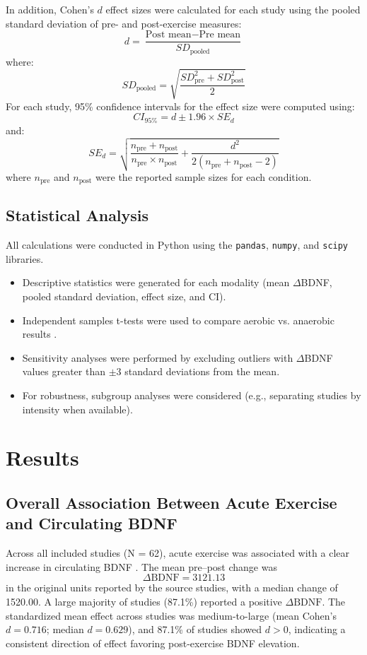 \documentclass[runningheads]{llncs}
\begin{document}
In addition, Cohen's $d$ effect sizes were calculated for each study using the pooled standard deviation of pre- and post-exercise measures:
\[
d = \frac{\text{Post mean} - \text{Pre mean}}{SD_{\text{pooled}}}
\]
where:
\[
SD_{\text{pooled}} = \sqrt{\frac{SD_{\text{pre}}^2 + SD_{\text{post}}^2}{2}}
\]
For each study, 95\% confidence intervals for the effect size were computed using:
\[
CI_{95\%} = d \pm 1.96 \times SE_d
\]
and:
\[
SE_d = \sqrt{\frac{n_{\text{pre}} + n_{\text{post}}}{n_{\text{pre}} \times n_{\text{post}}} + \frac{d^2}{2(n_{\text{pre}} + n_{\text{post}} - 2)}}
\]
where $n_{\text{pre}}$ and $n_{\text{post}}$ were the reported sample sizes for each condition.

\subsection{Statistical Analysis}
All calculations were conducted in Python using the \texttt{pandas}, \texttt{numpy}, and \texttt{scipy} libraries.  
\begin{itemize}
    \item Descriptive statistics were generated for each modality (mean $\Delta$BDNF, pooled standard deviation, effect size, and CI).
    \item Independent samples t-tests were used to compare aerobic vs. anaerobic results \cite{winter2007high}.
    \item Sensitivity analyses were performed by excluding outliers with $\Delta$BDNF values greater than $\pm 3$ standard deviations from the mean.
    \item For robustness, subgroup analyses were considered (e.g., separating studies by intensity when available).
\end{itemize}

\section{Results}

\subsection{Overall Association Between Acute Exercise and Circulating BDNF}
Across all included studies (N = 62), acute exercise was associated with a clear increase in circulating BDNF \cite{winter2007high}. The mean pre–post change was
\[
\Delta \text{BDNF} = 3121.13
\]
in the original units reported by the source studies, with a median change of 1520.00. A large majority of studies (87.1\%) reported a positive \(\Delta \text{BDNF}\).  
The standardized mean effect across studies was medium-to-large (mean Cohen’s \(d = 0.716\); median \(d = 0.629\)), and 87.1\% of studies showed \(d>0\), indicating a consistent direction of effect favoring post-exercise BDNF elevation.
\end{document}
